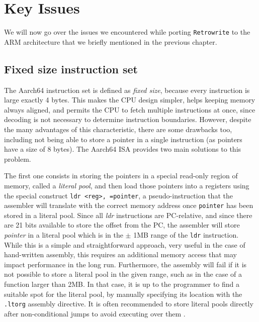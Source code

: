 \documentclass[a4paper,11pt,oneside]{report}
\begin{document}
\section{Key Issues}
We will now go over the issues we encountered while porting \texttt{Retrowrite} 
to the ARM architecture that we briefly mentioned in the previous chapter.  

\subsection{Fixed size instruction set}
The Aarch64 instruction set is defined as \emph{fixed size}, because every 
instruction is large exactly 4 bytes. This makes the CPU design simpler,
helps keeping memory always aligned, and permits the CPU to fetch multiple 
instructions at once, since decoding is not necessary to determine instruction 
boundaries. However, despite the many advantages of this characteristic, there 
are some drawbacks too, including not being able to store a pointer in a single 
instruction (as pointers have a size of 8 bytes). The Aarch64 ISA provides two 
main solutions to this problem. 

The first one consists in storing the pointers in a special read-only region of 
memory, called a \emph{literal pool}, and then load those pointers into a 
registers using the special construct \texttt{ldr <reg>, =pointer}, a 
pseudo-instruction that the assembler will translate with the correct memory 
address once \texttt{pointer} has been stored in a literal pool.  Since all 
\emph{ldr} instructions are PC-relative, and since there are 21 bits available 
to store the offset from the PC, the assembler will store \emph{pointer} in a 
literal pool which is in the $\pm$ 1MB range of the \texttt{ldr} instruction.  
While this is a simple and straightforward approach, very useful in the case of 
hand-written assembly, this requires an additional memory access that may 
impact performance in the long run. Furthermore, the assembly will fail if it 
is not possible to store a literal pool in the given range, such as in the case 
of a function larger than 2MB. In that case, it is up to the programmer to find 
a suitable spot for the literal pool, by manually specifying its location with 
the \texttt{.ltorg} assembly directive. It is often recommended to store 
literal pools directly after non-conditional jumps to avoid executing over them 
\cite{literalpools}.
\end{document}
